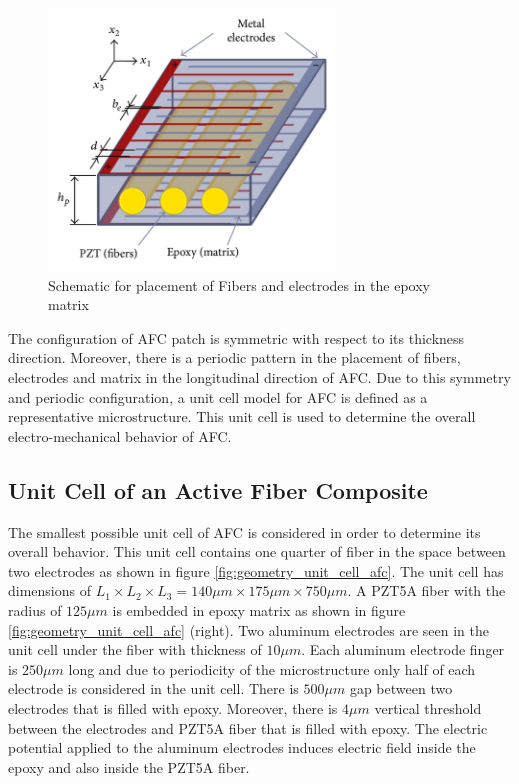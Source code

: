 \begin{figure} 
\centering
\includegraphics[width=3.0in]{./chap_4_structural_analyses/afc_unit_cell/schematic_afc_unit_cell.jpg}
\caption{Schematic for placement of Fibers and electrodes in the epoxy matrix \cite{jemai2014mathematical}}
\label{fig:schematic_afc_unit_cell}
\end{figure}

The configuration of AFC patch is symmetric with respect to its thickness direction.
Moreover, there is a periodic pattern in the placement of fibers, electrodes and matrix in the longitudinal direction of AFC.
Due to this symmetry and periodic configuration, a unit cell model for AFC is defined as a representative microstructure.
This unit cell is used to determine the overall electro-mechanical behavior of AFC.  
 
\subsection{Unit Cell of an Active Fiber Composite}
The smallest possible unit cell of AFC is considered in order to determine its overall behavior.
This unit cell contains one quarter of fiber in the space between two electrodes as shown in figure \ref{fig:geometry_unit_cell_afc}.
The unit cell has dimensions of $L_1 \times L_2 \times L_3 =140 \mu m \times 175 \mu m \times 750 \mu m$.
A PZT5A fiber with the radius of $125 \mu m$ is embedded in epoxy matrix as shown in figure \ref{fig:geometry_unit_cell_afc} (right).
Two aluminum electrodes are seen in the unit cell under the fiber with thickness of $10 \mu m$. 
Each aluminum electrode finger is $250 \mu m$ long and due to periodicity of the microstructure only half of each electrode is considered in the unit cell.
There is $500 \mu m$ gap between two electrodes that is filled with epoxy.
Moreover, there is $4 \mu m$ vertical threshold between the electrodes and PZT5A fiber that is filled with epoxy.
The electric potential applied to the aluminum electrodes induces electric field inside the epoxy and also inside the PZT5A fiber.

